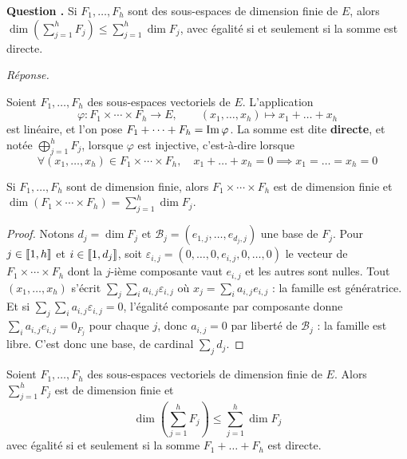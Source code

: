 \documentclass[11pt]{article}
\newcounter{qnum}
\newcommand{\question}[1]{%
\stepcounter{qnum}%
\bigskip
\noindent\textbf{Question \theqnum.} #1\par}
\newcommand{\reponse}{\noindent\textit{Réponse.}\ }
\begin{document}
\question{Si $F_1,\dots,F_h$ sont des sous-espaces de dimension finie de $E$, alors $\dim\left(\sum_{j=1}^{h}F_j\right)\leq\sum_{j=1}^{h}\dim F_j$, avec égalité si et seulement si la somme est directe.}
\reponse

\begin{defi}
\label{defi:somme}
Soient $F_1,\dots,F_h$ des sous-espaces vectoriels de $E$. L'application
\[\varphi : F_1\times\cdots\times F_h\longrightarrow E, \qquad (x_1,\dots,x_h)\longmapsto x_1+\dots+x_h\]
est linéaire, et l'on pose $F_1+\dots+F_h=\operatorname{Im}\varphi$. La somme est dite \textbf{directe}, et notée $\bigoplus_{j=1}^{h}F_j$, lorsque $\varphi$ est injective, c'est-à-dire lorsque
\[\forall (x_1,\dots,x_h)\in F_1\times\cdots\times F_h,\quad x_1+\dots+x_h=0 \implies x_1=\dots=x_h=0\]
\end{defi}

\begin{lemme}
\label{lemme:dim-produit}
Si $F_1,\dots,F_h$ sont de dimension finie, alors $F_1\times\cdots\times F_h$ est de dimension finie et $\dim(F_1\times\cdots\times F_h)=\sum_{j=1}^{h}\dim F_j$.
\end{lemme}

\begin{proof}
Notons $d_j=\dim F_j$ et $\mathcal{B}_j=(e_{1,j},\dots,e_{d_j,j})$ une base de $F_j$. Pour $j\in\llbracket 1,h \rrbracket$ et $i\in\llbracket 1,d_j \rrbracket$, soit $\varepsilon_{i,j}=(0,\dots,0,e_{i,j},0,\dots,0)$ le vecteur de $F_1\times\cdots\times F_h$ dont la $j$-ième composante vaut $e_{i,j}$ et les autres sont nulles. Tout $(x_1,\dots,x_h)$ s'écrit $\sum_{j}\sum_{i}a_{i,j}\varepsilon_{i,j}$ où $x_j=\sum_i a_{i,j}e_{i,j}$ : la famille est génératrice. Et si $\sum_j\sum_i a_{i,j}\varepsilon_{i,j}=0$, l'égalité composante par composante donne $\sum_i a_{i,j}e_{i,j}=0_{F_j}$ pour chaque $j$, donc $a_{i,j}=0$ par liberté de $\mathcal{B}_j$ : la famille est libre. C'est donc une base, de cardinal $\sum_j d_j$.
\end{proof}

\begin{prop}
\label{prop:dim-somme}
Soient $F_1,\dots,F_h$ des sous-espaces vectoriels de dimension finie de $E$. Alors $\sum_{j=1}^{h}F_j$ est de dimension finie et
\[\dim\left(\sum_{j=1}^{h}F_j\right) \leq \sum_{j=1}^{h}\dim F_j\]
avec égalité si et seulement si la somme $F_1+\dots+F_h$ est directe.
\end{prop}
\end{document}
